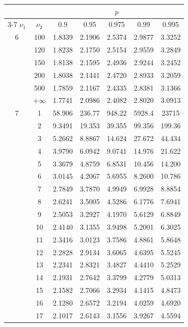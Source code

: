 \hfill
\begin{minipage}{0.49\textwidth}
	\begin{center}
		\begin{tabular}{ccccccc}
			& & \multicolumn{5}{c}{$p$}\\
			\cline{3-7}
			$\nu_1$ & $\nu_2$ & 0.9 & 0.95 & 0.975 & 0.99 & 0.995 \\
			\midrule
			6 & 100 & 1.8339 & 2.1906 & 2.5374 & 2.9877 & 3.3252 \\
			& 120 & 1.8238 & 2.1750 & 2.5154 & 2.9559 & 3.2849 \\
			& 150 & 1.8138 & 2.1595 & 2.4936 & 2.9244 & 3.2452 \\
			& 200 & 1.8038 & 2.1441 & 2.4720 & 2.8933 & 3.2059 \\
			& 500 & 1.7859 & 2.1167 & 2.4335 & 2.8381 & 3.1366 \\
			& $+\infty$ & 1.7741 & 2.0986 & 2.4082 & 2.8020 & 3.0913 \\
			\midrule
			7 & 1 & 58.906 & 236.77 & 948.22 & 5928.4 & 23715 \\
			& 2 & 9.3491 & 19.353 & 39.355 & 99.356 & 199.36 \\
			& 3 & 5.2662 & 8.8867 & 14.624 & 27.672 & 44.434 \\
			& 4 & 3.9790 & 6.0942 & 9.0741 & 14.976 & 21.622 \\
			& 5 & 3.3679 & 4.8759 & 6.8531 & 10.456 & 14.200 \\
			& 6 & 3.0145 & 4.2067 & 5.6955 & 8.2600 & 10.786 \\
			& 7 & 2.7849 & 3.7870 & 4.9949 & 6.9928 & 8.8854 \\
			& 8 & 2.6241 & 3.5005 & 4.5286 & 6.1776 & 7.6941 \\
			& 9 & 2.5053 & 3.2927 & 4.1970 & 5.6129 & 6.8849 \\[5pt]
			& 10 & 2.4140 & 3.1355 & 3.9498 & 5.2001 & 6.3025 \\
			& 11 & 2.3416 & 3.0123 & 3.7586 & 4.8861 & 5.8648 \\
			& 12 & 2.2828 & 2.9134 & 3.6065 & 4.6395 & 5.5245 \\
			& 13 & 2.2341 & 2.8321 & 3.4827 & 4.4410 & 5.2529 \\
			& 14 & 2.1931 & 2.7642 & 3.3799 & 4.2779 & 5.0313 \\
			& 15 & 2.1582 & 2.7066 & 3.2934 & 4.1415 & 4.8473 \\
			& 16 & 2.1280 & 2.6572 & 3.2194 & 4.0259 & 4.6920 \\
			& 17 & 2.1017 & 2.6143 & 3.1556 & 3.9267 & 4.5594 \\

\end{tabular}
\end{center}
\end{minipage}
